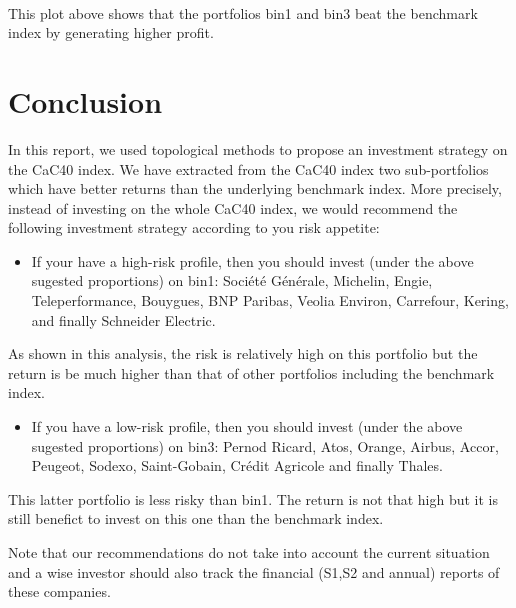 \documentclass[11pt]{article}
\providecommand{\tightlist}{%
      \setlength{\itemsep}{0pt}\setlength{\parskip}{0pt}}
\begin{document}
    \begin{center}
    \end{center}
    { \hspace*{\fill} \\}
    
    This plot above shows that the portfolios bin1 and bin3 beat the
benchmark index by generating higher profit.

\hypertarget{conclusion}{%
\section{Conclusion}\label{conclusion}}

In this report, we used topological methods to propose an investment
strategy on the CaC40 index. We have extracted from the CaC40 index two
sub-portfolios which have better returns than the underlying benchmark
index. More precisely, instead of investing on the whole CaC40 index, we
would recommend the following investment strategy according to you risk
appetite:

\begin{itemize}
\tightlist
\item
  If your have a high-risk profile, then you should invest (under the
  above sugested proportions) on bin1: Soci\'{e}t\'{e} G\'{e}n\'{e}rale, Michelin,
  Engie, Teleperformance, Bouygues, BNP Paribas, Veolia Environ,
  Carrefour, Kering, and finally Schneider Electric.
\end{itemize}

As shown in this analysis, the risk is relatively high on this portfolio
but the return is be much higher than that of other portfolios including
the benchmark index.

\begin{itemize}
\tightlist
\item
  If you have a low-risk profile, then you should invest (under the
  above sugested proportions) on bin3: Pernod Ricard, Atos, Orange,
  Airbus, Accor, Peugeot, Sodexo, Saint-Gobain, Cr\'{e}dit Agricole and
  finally Thales.
\end{itemize}

This latter portfolio is less risky than bin1. The return is not that
high but it is still benefict to invest on this one than the benchmark
index.

Note that our recommendations do not take into account the current
situation and a wise investor should also track the financial (S1,S2 and
annual) reports of these companies.
\end{document}
